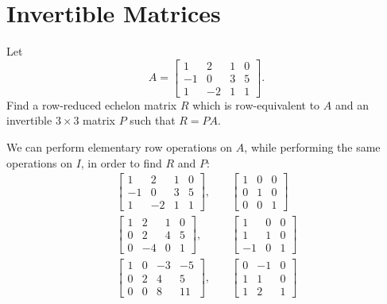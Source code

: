 \section{Invertible Matrices}

 Let
\begin{equation*}
  A =
  \begin{bmatrix}
    1 & 2 & 1 & 0 \\
    -1 & 0 & 3 & 5 \\
    1 & -2 & 1 & 1
  \end{bmatrix}.
\end{equation*}
Find a row-reduced echelon matrix $R$ which is row-equivalent to $A$
and an invertible $3\times3$ matrix $P$ such that $R = PA$.
\begin{solution}
  We can perform elementary row operations on $A$, while performing
  the same operations on $I$, in order to find $R$ and $P$:
  \begin{align*}
    \begin{bmatrix}
      1 & 2 & 1 & 0 \\
      -1 & 0 & 3 & 5 \\
      1 & -2 & 1 & 1
    \end{bmatrix},
    &\quad
    \begin{bmatrix}
      1 & 0 & 0 \\
      0 & 1 & 0 \\
      0 & 0 & 1
    \end{bmatrix} \\
    \begin{bmatrix}
      1 & 2 & 1 & 0 \\
      0 & 2 & 4 & 5 \\
      0 & -4 & 0 & 1
    \end{bmatrix},
    &\quad
    \begin{bmatrix}
      1 & 0 & 0 \\
      1 & 1 & 0 \\
      -1 & 0 & 1
    \end{bmatrix} \\
    \begin{bmatrix}
      1 & 0 & -3 & -5 \\
      0 & 2 & 4 & 5 \\
      0 & 0 & 8 & 11
    \end{bmatrix},
    &\quad
    \begin{bmatrix}
      0 & -1 & 0 \\
      1 & 1 & 0 \\
      1 & 2 & 1

\end{bmatrix}
\end{align*}
\end{solution}
